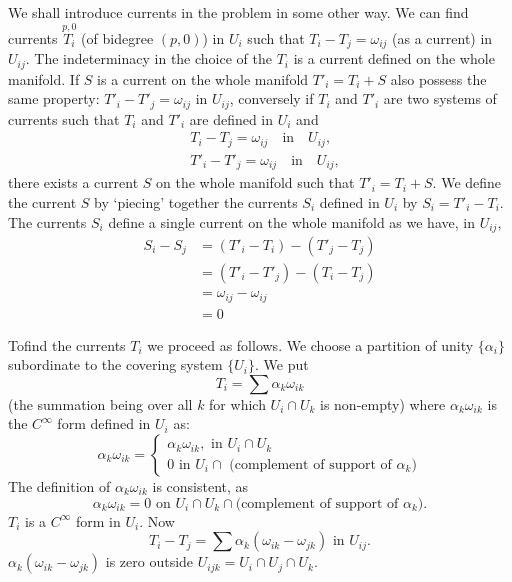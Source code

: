 We shall introduce currents in the problem in some other way. We can
find currents $\overset{p,0}{T_{i}}$ (of bidegree $(p,0)$) in $U_{i}$
such that $T_{i}-T_{j}=\omega_{ij}$ (as a current) in $U_{ij}$. The
indeterminacy in the choice of the $T_{i}$ is a current defined on the
whole manifold. If $S$ is a current on the whole manifold
$T'_{i}=T_{i}+S$ also possess the same property:
$T'_{i}-T'_{j}=\omega_{ij}$ in $U_{ij}$, conversely if $T_{i}$ and
$T'_{i}$ are two systems of currents such that $T_{i}$ and $T'_{i}$
are defined in $U_{i}$ and 
\begin{align*}
& T_{i}-T_{j}=\omega_{ij}\quad\text{in}\quad U_{ij},\\
& T'_{i}-T'_{j}=\omega_{ij}\quad\text{in}\quad U_{ij},
\end{align*}
there exists a current $S$ on the whole manifold such that
$T'_{i}=T_{i}+S$. We define the current $S$ by `piecing' together the
currents $S_{i}$ defined in $U_{i}$ by $S_{i}=T'_{i}-T_{i}$. The
currents $S_{i}$ define a single current on the whole manifold as we
have, in $U_{ij}$,
\begin{align*}
S_{i}-S_{j} &= (T'_{i}-T_{i})-(T'_{j}-T_{j})\\
           &= (T'_{i}-T'_{j})-(T_{i}-T_{j})\\
           &= \omega_{ij}-\omega_{ij}\\
           &= 0
\end{align*}

To\pageoriginale find the currents $T_{i}$ we proceed as follows. We
choose a partition of unity $\{\alpha_i\}$ subordinate to the covering
system $\{U_{i}\}$. We put
$$
T_{i}=\sum \alpha_{k}\omega_{ik}
$$
(the summation being over all $k$ for which $U_{i}\cap U_{k}$ is
non-empty) where $\alpha_{k}\omega_{ik}$ is the $C^{\infty}$ form
defined in $U_{i}$ as:
$$
\alpha_{k}\omega_{ik}=
\begin{cases}
\alpha_{k}\omega_{ik},\text{ \  in \ } U_{i}\cap U_{k}\\
0 \text{ \  in \ } U_{i}\cap \text{ (complement of support of $\alpha_{k}$)}
\end{cases}
$$
The definition of $\alpha_{k}\omega_{ik}$ is consistent, as 
$$
\alpha_{k}\omega_{ik}=0 \text{ \  on \ } U_{i}\cap U_{k}\cap \text{
  (complement of support of $\alpha_{k}$)}.
$$
$T_{i}$ is a $C^{\infty}$ form in $U_{i}$. Now
$$
T_{i}-T_{j}=\sum \alpha_{k}(\omega_{ik}-\omega_{jk})\text{ \  in \ }
U_{ij}.
$$
$\alpha_{k}(\omega_{ik}-\omega_{jk})$ is zero outside
$U_{ijk}=U_{i}\cap U_{j}\cap U_{k}$.

